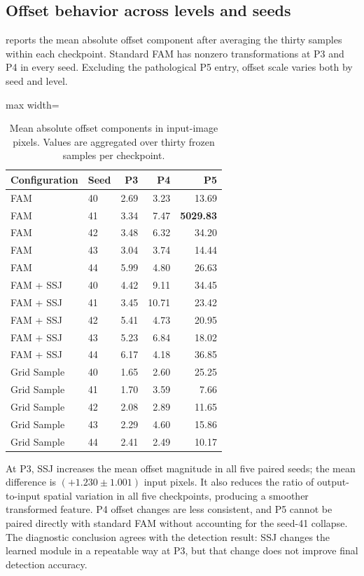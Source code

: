\subsection{Offset behavior across levels and seeds}

 reports the mean absolute offset component after
averaging the thirty samples within each checkpoint. Standard FAM has nonzero
transformations at P3 and P4 in every seed. Excluding the pathological P5
entry, offset scale varies both by seed and level.

\begin{table}[htbp]
  \centering
  \caption{Mean absolute offset components in input-image pixels. Values are
  aggregated over thirty frozen samples per checkpoint.}
  \label{tab:fam-offsets}
  \begin{adjustbox}{max width=\textwidth}
  \begin{tabular}{llrrr}
    \toprule
    Configuration & Seed & P3 & P4 & P5 \\
    \midrule
    FAM & 40 & 2.69 & 3.23 & 13.69 \\
    FAM & 41 & 3.34 & 7.47 & \textbf{5029.83} \\
    FAM & 42 & 3.48 & 6.32 & 34.20 \\
    FAM & 43 & 3.04 & 3.74 & 14.44 \\
    FAM & 44 & 5.99 & 4.80 & 26.63 \\
    \midrule
    FAM + SSJ & 40 & 4.42 & 9.11 & 34.45 \\
    FAM + SSJ & 41 & 3.45 & 10.71 & 23.42 \\
    FAM + SSJ & 42 & 5.41 & 4.73 & 20.95 \\
    FAM + SSJ & 43 & 5.23 & 6.84 & 18.02 \\
    FAM + SSJ & 44 & 6.17 & 4.18 & 36.85 \\
    \midrule
    Grid Sample & 40 & 1.65 & 2.60 & 25.25 \\
    Grid Sample & 41 & 1.70 & 3.59 & 7.66 \\
    Grid Sample & 42 & 2.08 & 2.89 & 11.65 \\
    Grid Sample & 43 & 2.29 & 4.60 & 15.86 \\
    Grid Sample & 44 & 2.41 & 2.49 & 10.17 \\
    \bottomrule
  \end{tabular}
  \end{adjustbox}
\end{table}

At P3, SSJ increases the mean offset magnitude in all five paired seeds; the
mean difference is \((+1.230\pm1.001)\) input pixels. It also reduces the ratio
of output-to-input spatial variation in all five checkpoints, producing a
smoother transformed feature. P4 offset changes are less consistent, and P5
cannot be paired directly with standard FAM without accounting for the seed-41
collapse. The diagnostic conclusion agrees with the detection result: SSJ
changes the learned module in a repeatable way at P3, but that change does not
improve final detection accuracy.

